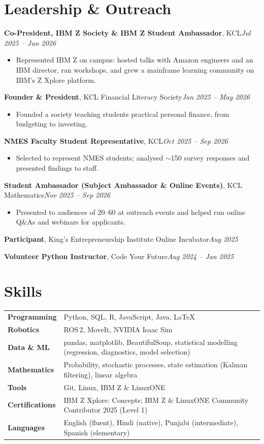 \documentclass[10pt,a4paper]{article}
\newcommand{\entry}[3]{\vspace{3pt}\textbf{#1}, #2\hfill\textit{#3}\par}
\begin{document}
\section{Leadership \& Outreach}
\entry{Co-President, IBM Z Society \& IBM Z Student Ambassador}{KCL}{Jul 2025 -- Jun 2026}
\begin{itemize}
  \item Represented IBM Z on campus: hosted talks with Amazon engineers and an IBM director, ran workshops, and grew a mainframe learning community on IBM's Z Xplore platform.
\end{itemize}
\entry{Founder \& President}{KCL Financial Literacy Society}{Jan 2025 -- May 2026}
\begin{itemize}
  \item Founded a society teaching students practical personal finance, from budgeting to investing.
\end{itemize}
\entry{NMES Faculty Student Representative}{KCL}{Oct 2025 -- Sep 2026}
\begin{itemize}
  \item Selected to represent NMES students; analysed $\sim$150 survey responses and presented findings to staff.
\end{itemize}
\entry{Student Ambassador (Subject Ambassador \& Online Events)}{KCL Mathematics}{Nov 2025 -- Sep 2026}
\begin{itemize}
  \item Presented to audiences of 20--60 at outreach events and helped run online Q\&As and webinars for applicants.
\end{itemize}
\entry{Participant}{King's Entrepreneurship Institute Online Incubator}{Aug 2025}
\entry{Volunteer Python Instructor}{Code Your Future}{Aug 2024 -- Jan 2025}

\section{Skills}
{\renewcommand{\arraystretch}{1.15}
\begin{tabularx}{\linewidth}{@{}>{\bfseries}l@{\hspace{12pt}}X@{}}
  Programming    & Python, SQL, R, JavaScript, Java, LaTeX \\
  Robotics       & ROS\,2, MoveIt, NVIDIA Isaac Sim \\
  Data \& ML     & pandas, matplotlib, BeautifulSoup, statistical modelling (regression, diagnostics, model selection) \\
  Mathematics    & Probability, stochastic processes, state estimation (Kalman filtering), linear algebra \\
  Tools          & Git, Linux, IBM Z \& LinuxONE \\
  Certifications & IBM Z Xplore: Concepts; IBM Z \& LinuxONE Community Contributor 2025 (Level 1) \\
  Languages      & English (fluent), Hindi (native), Punjabi (intermediate), Spanish (elementary) \\
\end{tabularx}}
\end{document}

